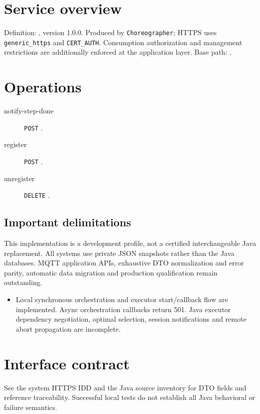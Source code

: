 \documentclass[a4paper]{arrowhead}
\begin{document}
\ArrowheadSetup
\section{Service overview}
Definition: , version 1.0.0. Produced by \texttt{Choreographer}; HTTPS uses \texttt{generic\_https} and \texttt{CERT\_AUTH}. Consumption authorization and management restrictions are additionally enforced at the application layer. Base path: .
\section{Operations}
\begin{description}
\item[notify-step-done] \texttt{POST} .
\item[register] \texttt{POST} .
\item[unregister] \texttt{DELETE} .
\end{description}
\subsection{Important delimitations}
This implementation is a development profile, not a certified interchangeable Java replacement. All systems use private JSON snapshots rather than the Java databases. MQTT application APIs, exhaustive DTO normalization and error parity, automatic data migration and production qualification remain outstanding.
\begin{itemize}
\item Local synchronous orchestration and executor start/callback flow are implemented. Async orchestration callbacks return 501. Java executor dependency negotiation, optimal selection, session notifications and remote abort propagation are incomplete.
\end{itemize}
\section{Interface contract}
See the system HTTPS IDD and the Java source inventory for DTO fields and reference traceability. Successful local tests do not establish all Java behavioral or failure semantics.
\end{document}
